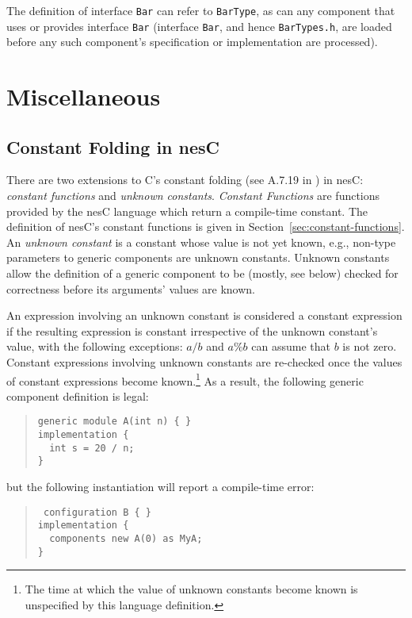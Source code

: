 \documentclass[11pt,letterpaper]{article}
\newcommand{\code}[1]{{\tt #1}}
\newcommand{\file}[1]{{\tt #1}}
\newcommand{\nesc}{nesC\xspace}
\begin{document}
The definition of interface \code{Bar} can refer to \code{BarType}, as can
any component that uses or provides interface \code{Bar} (interface
\code{Bar}, and hence \file{BarTypes.h}, are loaded before any such
component's specification or implementation are processed).

\section{Miscellaneous}
\label{sec:misc}

\subsection{Constant Folding in \nesc}
\label{sec:constant-folding}

There are two extensions to C's constant folding (see A.7.19 in
\cite{kandr}) in \nesc: \emph{constant functions} and \emph{unknown
constants}. \emph{Constant Functions} are functions provided by the \nesc
language which return a compile-time constant. The definition of \nesc's
constant functions is given in Section~\ref{sec:constant-functions}. An
\emph{unknown constant} is a constant whose value is not yet known, e.g.,
non-type parameters to generic components are unknown constants. Unknown
constants allow the definition of a generic component to be (mostly, see
below) checked for correctness before its arguments' values are known.

An expression involving an unknown constant is considered a constant
expression if the resulting expression is constant irrespective of the
unknown constant's value, with the following exceptions: $a / b$ and $a \%
b$ can assume that $b$ is not zero. Constant expressions involving unknown
constants are re-checked once the values of constant expressions become
known.\footnote{The time at which the value of unknown constants become
known is unspecified by this language definition.} As a result, the
following generic component definition is legal:
\begin{quote}
\begin{verbatim}
generic module A(int n) { }
implementation {
  int s = 20 / n;
}
\end{verbatim}
\end{quote}
but the following instantiation will report a compile-time error:
\begin{quote}
\begin{verbatim}
 configuration B { }
implementation {
  components new A(0) as MyA;
}
\end{verbatim}
\end{quote}
\end{document}
